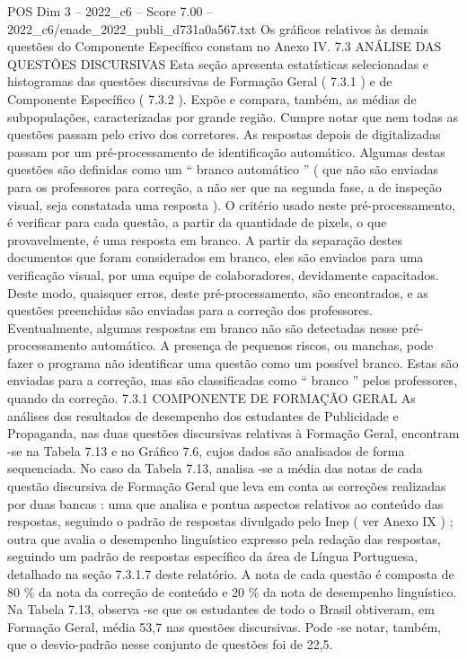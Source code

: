 \begin{textsample}{POS Dim 3 – 2022\_c6 – Score 7.00 – 2022\_c6/enade\_2022\_publi\_d731a0a567.txt}
Os gráficos relativos às demais questões do Componente Específico constam no Anexo IV. 7.3 ANÁLISE DAS QUESTÕES DISCURSIVAS Esta seção apresenta estatísticas selecionadas e histogramas das questões discursivas de Formação Geral ( 7.3.1 ) e de Componente Específico ( 7.3.2 ).
Expõe e compara, também, as médias de subpopulações, caracterizadas por grande região.
Cumpre notar que nem todas as questões passam pelo crivo dos corretores.
As respostas depois de digitalizadas passam por um pré-processamento de identificação automático.
Algumas destas questões são definidas como um “ branco automático ” ( que não são enviadas para os professores para correção, a não ser que na segunda fase, a de inspeção visual, seja constatada uma resposta ).
O critério usado neste pré-processamento, é verificar para cada questão, a partir da quantidade de pixels, o que provavelmente, é uma resposta em branco.
A partir da separação destes documentos que foram considerados em branco, eles são enviados para uma verificação visual, por uma equipe de colaboradores, devidamente capacitados.
Deste modo, quaisquer erros, deste pré-processamento, são encontrados, e as questões preenchidas são enviadas para a correção dos professores.
Eventualmente, algumas respostas em branco não são detectadas nesse pré-processamento automático.
A presença de pequenos riscos, ou manchas, pode fazer o programa não identificar uma questão como um possível branco.
Estas são enviadas para a correção, mas são classificadas como “ branco ” pelos professores, quando da correção. 7.3.1 COMPONENTE DE FORMAÇÃO GERAL As análises dos resultados de desempenho dos estudantes de Publicidade e Propaganda, nas duas questões discursivas relativas à Formação Geral, encontram -se na Tabela 7.13 e no Gráfico 7.6, cujos dados são analisados de forma sequenciada.
No caso da Tabela 7.13, analisa -se a média das notas de cada questão discursiva de Formação Geral que leva em conta as correções realizadas por duas bancas : uma que analisa e pontua aspectos relativos ao conteúdo das respostas, seguindo o padrão de respostas divulgado pelo Inep ( ver Anexo IX ) ; outra que avalia o desempenho linguístico expresso pela redação das respostas, seguindo um padrão de respostas específico da área de Língua Portuguesa, detalhado na seção 7.3.1.7 deste relatório.
A nota de cada questão é composta de 80 \% da nota da correção de conteúdo e 20 \% da nota de desempenho linguístico.
Na Tabela 7.13, observa -se que os estudantes de todo o Brasil obtiveram, em Formação Geral, média 53,7 nas questões discursivas.
Pode -se notar, também, que o desvio-padrão nesse conjunto de questões foi de 22,5.

\end{textsample}
